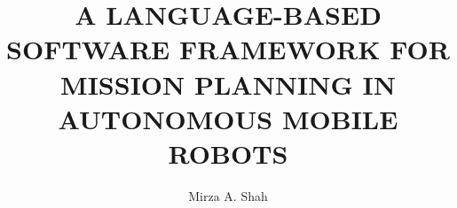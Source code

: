 \documentclass[11pt]{psuthesis}
\begin{document}



\author{Mirza A. Shah}


\title{\uppercase {A Language-Based Software Framework for Mission Planning in Autonomous Mobile Robots}}





\begin{singlespace}




\begin{frontmatter}


\begin{doublespace}
\titlepage
\end{doublespace}

\committeepage






\end{frontmatter}
\end{singlespace}
\end{document}
